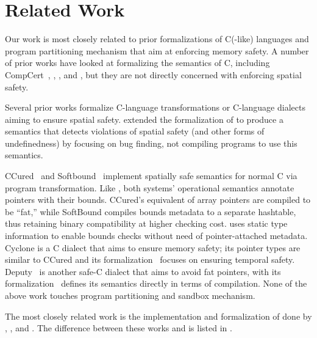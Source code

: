 \section{Related Work}
\label{sec:related}

Our work is most closely related to prior formalizations of C(-like)
languages and program partitioning mechanism 
that aim at enforcing memory safety.
A number of prior works have looked at formalizing the semantics of C,
including CompCert~\cite{Blazy2009,leroy:hal-00703441},
\citet{ellison-rosu-2012-popl}, \citet{Kang:2015:FCM:2813885.2738005},
and \citet{10.1145/2980983.2908081, Memarian:2019:ECS:3302515.3290380},
but they are not directly concerned with enforcing
spatial safety.

%
Several prior works formalize C-language transformations or C-language
dialects aiming to ensure spatial safety. 
%
\citet{10.1145/2813885.2737979} extended the formalization
of \citet{ellison-rosu-2012-popl} to produce a semantics that detects
violations of spatial safety (and other forms of undefinedness) 
by focusing on bug finding, not compiling programs to use this semantics.

CCured~\cite{Necula2005} and Softbound~\cite{softbound} implement
spatially safe semantics for normal C via program transformation. Like
\lang, both systems' operational semantics annotate pointers with
their bounds. CCured's equivalent of array pointers are compiled to be
``fat,'' while SoftBound compiles bounds metadata to a separate
hashtable, thus retaining binary compatibility at higher checking
cost. \systemname uses static type information to enable bounds checks
without need of pointer-attached metadata.
Cyclone \cite{Jim2002,GrossmanMJHWC02} is a C dialect that aims to
ensure memory safety; its pointer types are similar to
CCured and its formalization~\cite{GrossmanMJHWC02} focuses on ensuring temporal safety. 
Deputy~\cite{Feng2006,Condit2007}
is another safe-C dialect that aims to avoid fat pointers,
with its formalization~\cite{Condit2007} defines its
semantics directly in terms of compilation.
None of the above work touches program partitioning and sandbox mechanism. 

The most closely related work is the
implementation and formalization of \checkedc done by \citet{checkedc}, \citet{machiry2022c}, \citet{ruef18checkedc-incr} and \citet{li22checkedc}.
The difference between these works and \systemname is listed in .

